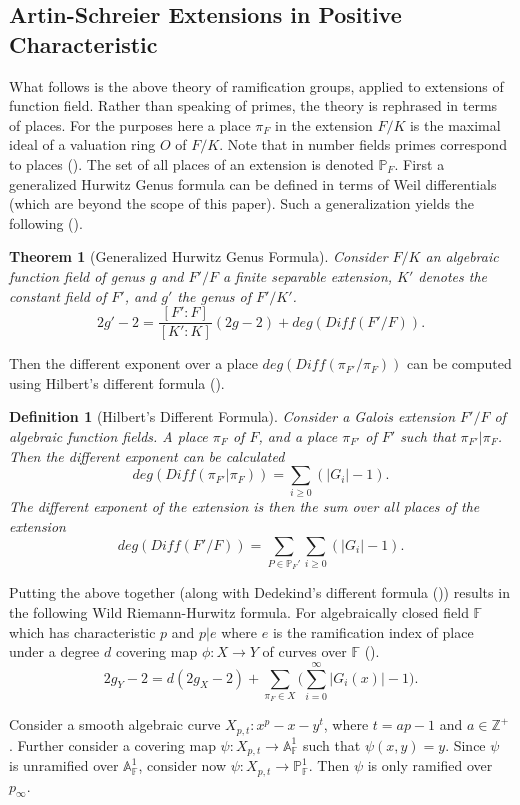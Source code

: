 \documentclass[paper=a4, fontsize=11pt]{scrartcl} %
\numberwithin{equation}{section} %
\numberwithin{figure}{section} %
\numberwithin{table}{section} %
\theoremstyle{break}
\newtheorem{defn}{Definition}
\newtheorem{thm}{Theorem}
\begin{document}
\subsection{Artin-Schreier Extensions in Positive Characteristic}
What follows is the above theory of ramification groups, applied to extensions of function field. Rather than speaking of primes, the theory is rephrased in terms of places. For the purposes here a place $\pi_F$ in the extension $F/K$ is the maximal ideal of a valuation ring $O$ of $F/K$. Note that in number fields primes correspond to places (\cite{stitchenoth}). The set of all places of an extension is denoted $\mathbb{P}_F$. First a generalized Hurwitz Genus formula can be defined in terms of Weil differentials (which are beyond the scope of this paper). Such a generalization yields the following (\cite{stitchenoth}).
\begin{thm}[Generalized Hurwitz Genus Formula]
Consider $F/K$ an algebraic function field of genus $g$ and $F'/F$ a finite separable extension, $K'$ denotes the constant field of $F'$, and $g'$ the genus of $F'/K'$.
$$
2g'-2=\frac{[F':F]}{[K':K]}(2g-2) + deg(Diff(F'/F)).
$$
\end{thm}
Then the different exponent over a place $deg(Diff(\pi_{F'}/\pi_{F}))$ can be computed using Hilbert's different formula  (\cite{stitchenoth}).
\begin{defn}[Hilbert's Different Formula]
Consider a Galois extension $F'/F$ of algebraic function fields. A place $\pi_F$ of $F$, and a place $\pi_{F'}$ of $F'$ such that $\pi_{F'}|\pi_F$. Then the different exponent can be calculated
$$
deg(Diff(\pi_{F'}|\pi_{F})) = \sum_{i\geq 0}(|G_i| -1).
$$
The different exponent of the extension is then the sum over all places of the extension
$$
deg(Diff(F'/F)) = \sum_{P\in\mathbb{P}_F'}\sum_{i\geq 0}(|G_i| -1).
$$
\end{defn}
Putting the above together (along with Dedekind's different formula (\cite{stitchenoth})) results in the following Wild Riemann-Hurwitz formula. For algebraically closed field $\mathbb{F}$ which has characteristic $p$ and $p|e$ where $e$ is the ramification index of place under a degree $d$ covering map $\phi:X \to Y$ of curves over $\mathbb{F}$ (\cite{RnR}). 
$$
2g_Y -2 = d(2g_X -2) + \sum_{\pi_F \in X} \big( \sum^{\infty}_{i=0}|G_i(x)| -1 \big).
$$

Consider a smooth algebraic curve $X_{p,t}: x^p - x - y^t$, where $t=ap-1$ and $a\in \mathbb{Z}^{+}$. Further consider a covering map $\psi: X_{p,t} \to \mathbb{A}^1_\mathbb{F}$ such that $\psi(x,y)=y$. 
Since $\psi$ is unramified over $\mathbb{A}^1_\mathbb{F}$, consider now $\psi: X_{p,t} \to \mathbb{P}^1_\mathbb{F}$. Then $\psi$ is only ramified over $p_\infty$. 
\end{document}
